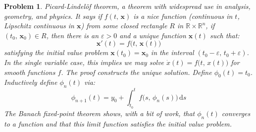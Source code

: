 \documentclass{article}
\theoremstyle{normal}
\newtheorem{problem}{Problem}
\begin{document}
\begin{problem}
        \textit{Picard-Lindel\"{o}f theorem}, a theorem with widespread use
        in analysis, geometry, and physics. It says if $f(t,\,\mathbf{x})$ is a
        \textit{nice} function (continuous in $t$, Lipschitz continuous in
        $\mathbf{x}$) from some closed rectangle $R$ in
        $\mathbb{R}\times\mathbb{R}^{n}$, if $(t_{0},\,\mathbf{x}_{0})\in{R}$,
        then there is an $\varepsilon>0$ and
        a unique function $\mathbf{x}(t)$ such that:
        \begin{equation}
            \mathbf{x}'(t)=f\big(t,\,\mathbf{x}(t)\big)
        \end{equation}
        satisfying the initial value problem $\mathbf{x}(t_{0})=\mathbf{x}_{0}$
        in the interval $(t_{0}-\varepsilon,\,t_{0}+\varepsilon)$.
        In the single variable case, this implies we may solve
        $\dot{x}(t)=f\big(t,\,x(t)\big)$ for smooth functions $f$. The proof
        constructs the unique solution. Define
        $\phi_{0}(t)=t_{0}$. Inductively define $\phi_{n}(t)$ via:
        \begin{equation}
            \phi_{n+1}(t)=y_{0}+\int_{t_{0}}^{t}f\big(s,\,\phi_{n}(s)\big)\,
                \textrm{d}s
        \end{equation}
        The Banach fixed-point theorem shows, with a bit of work, that
        $\phi_{n}(t)$ converges to a function and that this limit function
        satisfies the initial value problem.
    \end{problem}
\end{document}
